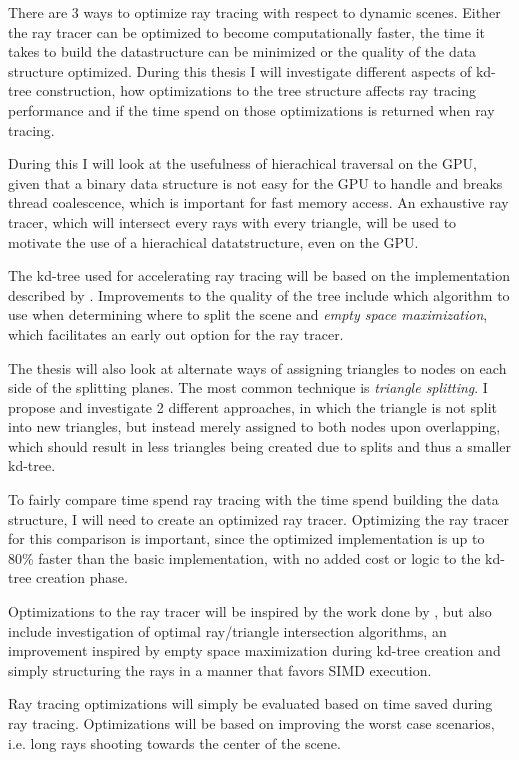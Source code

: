 There are 3 ways to optimize ray tracing with respect to dynamic
scenes. Either the ray tracer can be optimized to become
computationally faster, the time it takes to build the datastructure
can be minimized or the quality of the data structure
optimized. During this thesis I will investigate different aspects of
kd-tree construction, how optimizations to the tree structure affects
ray tracing performance and if the time spend on those optimizations
is returned when ray tracing.

During this I will look at the usefulness of hierachical traversal on
the GPU, given that a binary data structure is not easy for the GPU to
handle and breaks thread coalescence, which is important for fast
memory access. An exhaustive ray tracer, which will intersect every
rays with every triangle, will be used to motivate the use of a
hierachical datatstructure, even on the GPU.

The kd-tree used for accelerating ray tracing will be based on the
implementation described by \zhou.  Improvements to the quality of the
tree include which algorithm to use when determining where to split
the scene and \textit{empty space maximization}, which facilitates an
early out option for the ray tracer.

The thesis will also look at alternate ways of assigning triangles to
nodes on each side of the splitting planes. The most common technique
is \textit{triangle splitting}. I propose and investigate 2 different
approaches, in which the triangle is not split into new triangles, but
instead merely assigned to both nodes upon overlapping, which should
result in less triangles being created due to splits and thus a
smaller kd-tree.

To fairly compare time spend ray tracing with the time spend building
the data structure, I will need to create an optimized ray
tracer. Optimizing the ray tracer for this comparison is important,
since the optimized implementation is up to 80\% faster than the basic
implementation, with no added cost or logic to the kd-tree creation
phase.

Optimizations to the ray tracer will be inspired by the work done by
\horn , but also include investigation of optimal ray/triangle
intersection algorithms, an improvement inspired by empty space
maximization during kd-tree creation and simply structuring the rays in a
manner that favors SIMD execution.



Ray tracing optimizations will simply be evaluated based on time saved
during ray tracing. Optimizations will be based on improving the
worst case scenarios, i.e. long rays shooting towards the center of
the scene.

